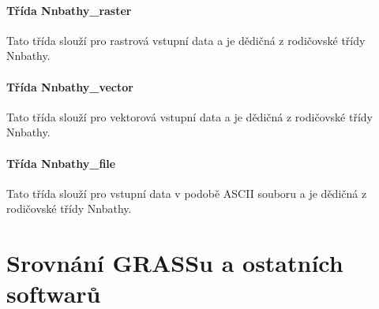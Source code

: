\documentclass[12pt,a4paper]{article}
\begin{document}
\paragraph{Třída Nnbathy\_raster}
Tato třída slouží pro rastrová vstupní data a je dědičná z rodičovské třídy Nnbathy.

\paragraph{Třída Nnbathy\_vector}
Tato třída slouží pro vektorová vstupní data a je dědičná z rodičovské třídy Nnbathy.

\paragraph{Třída Nnbathy\_file}
Tato třída slouží pro vstupní data v podobě ASCII souboru a je dědičná z rodičovské třídy Nnbathy.

\newpage
\section{Srovnání GRASSu a ostatních softwarů}
\end{document}
